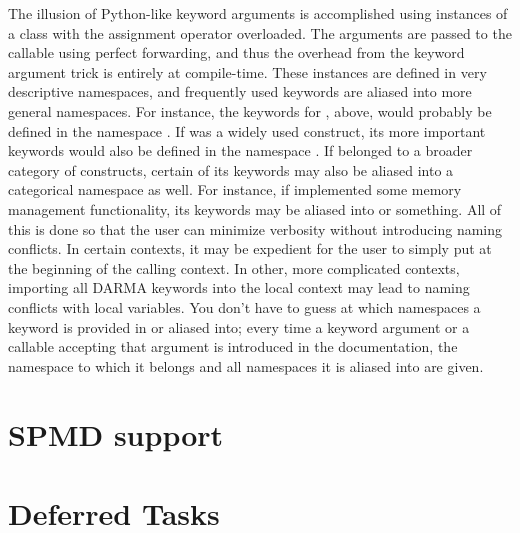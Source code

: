 The illusion of Python-like keyword arguments is accomplished using  instances
of a class with the assignment operator overloaded.  The arguments are passed to the 
callable using perfect forwarding, and thus the overhead from the keyword argument 
trick is entirely at compile-time.  These instances are defined in very descriptive
namespaces, and frequently used keywords are aliased into more general namespaces.  For
instance, the keywords for , above, would probably be defined in the 
namespace .  If  was a 
widely used construct, its more important keywords would also be defined in the namespace
.  If  belonged to a broader category of 
constructs, certain of its keywords may also be aliased into a categorical namespace
as well.  For instance, if  implemented some memory management functionality,
its keywords may be aliased into  or 
something.  All of this is done so that the user can minimize verbosity without introducing
naming conflicts.  In certain contexts, it may be expedient for the user to simply
put  at the beginning of the calling context.  In other,
more complicated contexts, importing all DARMA keywords into the local context may
lead to naming conflicts with local variables.  You don't have to guess at which namespaces
a keyword is provided in or aliased into; every time a keyword argument or a callable
accepting that argument is introduced in the documentation, the namespace to which 
it belongs and all namespaces it is aliased into are given.



\section{SPMD support}
\label{sec:spmd}





\section{Deferred Tasks}
\label{sec:deferred}

